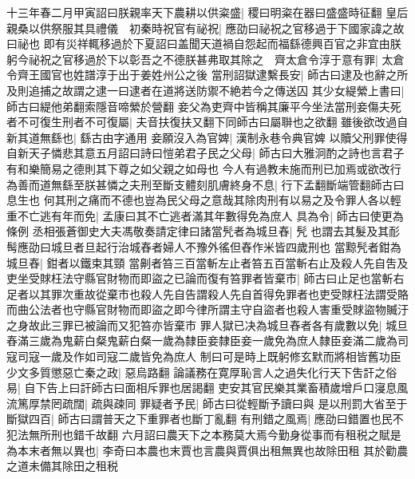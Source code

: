十三年春二月甲寅詔曰朕親率天下農耕以供粢盛|{
	稷曰明粢在器曰盛盛時征翻}
皇后親桑以供祭服其具禮儀　初秦時祝官有祕祝|{
	應劭曰祕祝之官移過于下國家諱之故曰祕也}
即有災祥輒移過於下夏詔曰盖聞天道禍自怨起而福繇德興百官之非宜由朕躬今祕祝之官移過於下以彰吾之不德朕甚弗取其除之　齊太倉令淳于意有罪|{
	太倉令齊王國官也姓譜淳于出于姜姓州公之後}
當刑詔獄逮繫長安|{
	師古曰逮及也辭之所及則追捕之故謂之逮一曰逮者在道將送防禦不絶若今之傳送囚}
其少女緹縈上書曰|{
	師古曰緹他弟翻索隱音啼縈於營翻}
妾父為吏齊中皆稱其廉平今坐法當刑妾傷夫死者不可復生刑者不可復屬|{
	夫音扶復扶又翻下同師古曰屬聨也之欲翻}
雖後欲改過自新其道無繇也|{
	繇古由字通用}
妾願沒入為官婢|{
	漢制永巷令典官婢}
以贖父刑罪使得自新天子憐悲其意五月詔曰詩曰愷弟君子民之父母|{
	師古曰大雅泂酌之詩也言君子有和樂簡易之德則其下尊之如父親之如母也}
今人有過教未施而刑已加焉或欲改行為善而道無繇至朕甚憐之夫刑至斷支體刻肌膚終身不息|{
	行下孟翻斷端管翻師古曰息生也}
何其刑之痛而不德也豈為民父母之意哉其除肉刑有以易之及令罪人各以輕重不亡逃有年而免|{
	孟康曰其不亡逃者滿其年數得免為庶人}
具為令|{
	師古曰使更為條例}
丞相張蒼御史大夫馮敬奏請定律曰諸當髠者為城旦舂|{
	髠也謂去其髮及其耏髩應劭曰城旦者旦起行治城舂者婦人不豫外徭但舂作米皆四歲刑也}
當黥髠者鉗為城旦舂|{
	鉗者以鐵束其頸}
當劓者笞三百當斬左止者笞五百當斬右止及殺人先自吿及吏坐受賕枉法守縣官財物而即盜之已論而復有笞罪者皆棄市|{
	師古曰止足也當斬右足者以其罪次重故從棄市也殺人先自告謂殺人先自首得免罪者也吏受賕枉法謂受賂而曲公法者也守縣官財物而即盜之即今律所謂主守自盜者也殺人害重受賕盜物贓汙之身故此三罪已被論而又犯笞亦皆棄市}
罪人獄已决為城旦舂者各有歲數以免|{
	城旦舂滿三歲為鬼薪白粲鬼薪白粲一歲為隸臣妾隸臣妾一歲免為庶人隸臣妾滿二歲為司寇司寇一歲及作如司寇二歲皆免為庶人}
制曰可是時上既躬修玄默而將相皆舊功臣少文多質懲惡亡秦之政|{
	惡烏路翻}
論議務在寛厚恥言人之過失化行天下吿訐之俗易|{
	自下告上曰訐師古曰面相斥罪也居謁翻}
吏安其官民樂其業畜積歲增戶口寖息風流篤厚禁罔疏闊|{
	疏與疎同}
罪疑者予民|{
	師古曰從輕斷予讀曰與}
是以刑罰大省至于斷獄四百|{
	師古曰謂普天之下重罪者也斷丁亂翻}
有刑錯之風焉|{
	應劭曰錯置也民不犯法無所刑也錯千故翻}
六月詔曰農天下之本務莫大焉今勤身從事而有租税之賦是為本末者無以異也|{
	李奇曰本農也末賈也言農與賈俱出租無異也故除田租}
其於勸農之道未備其除田之租税

